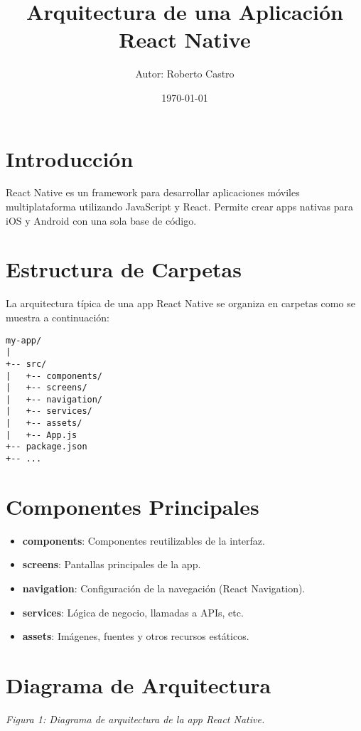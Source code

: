 \documentclass[a4paper,12pt]{article}
\title{Arquitectura de una Aplicación React Native}
\author{Autor: Roberto Castro}
\date{\today}
\begin{document}
\maketitle

\section{Introducción}
React Native es un framework para desarrollar aplicaciones móviles multiplataforma utilizando JavaScript y React. Permite crear apps nativas para iOS y Android con una sola base de código.

\section{Estructura de Carpetas}
La arquitectura típica de una app React Native se organiza en carpetas como se muestra a continuación:

\begin{verbatim}
my-app/
|
+-- src/
|   +-- components/
|   +-- screens/
|   +-- navigation/
|   +-- services/
|   +-- assets/
|   +-- App.js
+-- package.json
+-- ...
\end{verbatim}


\section{Componentes Principales}
\begin{itemize}
    \item \textbf{components}: Componentes reutilizables de la interfaz.
    \item \textbf{screens}: Pantallas principales de la app.
    \item \textbf{navigation}: Configuración de la navegación (React Navigation).
    \item \textbf{services}: Lógica de negocio, llamadas a APIs, etc.
    \item \textbf{assets}: Imágenes, fuentes y otros recursos estáticos.
\end{itemize}

\section{Diagrama de Arquitectura}
\begin{center}
\end{center}
\textit{Figura 1: Diagrama de arquitectura de la app React Native.}
\end{document}
